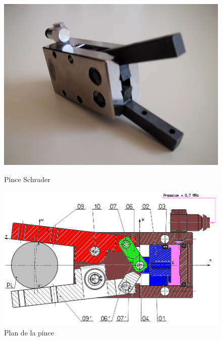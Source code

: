 \begin{figure}[htbp]
\begin{minipage}[c]{.4\linewidth}
\begin{center}
\includegraphics[width=\linewidth]{img/pince_schrader.jpg}
\caption{Pince Schrader}
\label{fig:image6}
\end{center}
\end{minipage}
\hfill
\begin{minipage}[c]{.55\linewidth}
\begin{center}
\includegraphics[width=\linewidth]{img/ps_plan.png}
\caption{Plan de la pince}
\label{fig:image7}
\end{center}
\end{minipage}
\end{figure}

